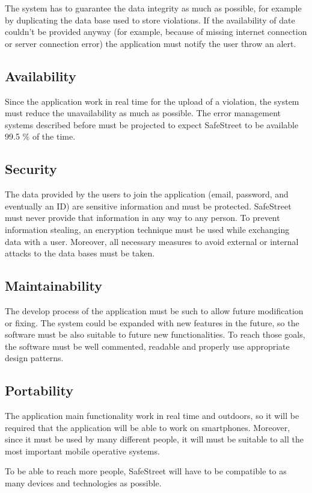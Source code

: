 \documentclass[../RASD.tex]{subfiles}
\begin{document}
            The system has to guarantee the data integrity as much as possible, for example by duplicating the data base used to store violations. If the availability of date couldn’t be provided anyway (for example, because of missing internet connection or server connection error) the application must notify the user throw an alert.
            \subsection{Availability}\label{subsec:availability}
            Since the application work in real time for the upload of a violation, the system must reduce the unavailability as much as possible. The error management systems described before must be projected to expect SafeStreet to be available 99.5 \% of the time.
                    \subsection{Security}\label{subsec:security}
            The data provided by the users to join the application (email, password, and eventually an ID) are sensitive information and must be protected. SafeStreet must never provide that information in any way to any person. To prevent information stealing, an encryption technique must be used while exchanging data with a user. Moreover, all necessary measures to avoid external or internal attacks to the data bases must be taken.
            \subsection{Maintainability}\label{subsec:maintainability}
            The develop process of the application must be such to allow future modification or fixing. The system could be expanded with new features in the future, so the software must be also suitable to future new functionalities. To reach those goals, the software must be well commented, readable and properly use appropriate design patterns.
            \subsection{Portability}\label{subsec:portability}
            The application main functionality work in real time and outdoors, so it will be required that the application will be able to work on smartphones. Moreover, since it must be used by many different people, it will must be suitable to all the most important mobile operative systems.

            To be able to reach more people, SafeStreet will have to be compatible to as many devices and technologies as possible.
\end{document}
